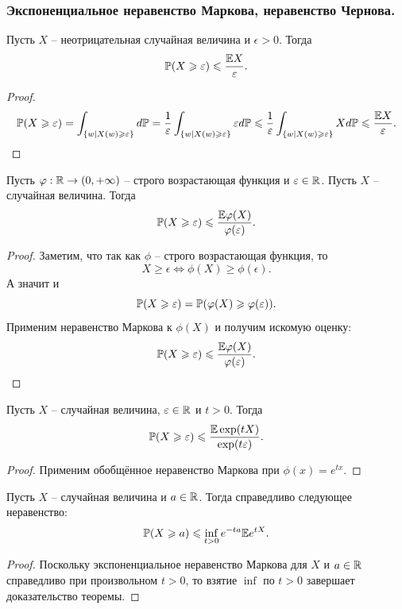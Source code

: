 \subsubsection{Экспоненциальное неравенство Маркова, неравенство Чернова.}
\begin{theorem}
    Пусть $X$ -- неотрицательная случайная величина и $\epsilon > 0$. Тогда
    \[
        \P(X \geq \epsilon) \leq \dfrac{\Ex X}{\epsilon}.
    \]
\end{theorem}
\begin{proof}
    \[
        \P(X \geq \epsilon) = \int_{\{w \mid X(w) \geq \epsilon\}} d\P = \dfrac{1}{\epsilon} \int_{\{w \mid X(w) \geq \epsilon\}} \epsilon d\P \leq \dfrac{1}{\epsilon} \int_{\{w \mid X(w) \geq \epsilon\}} Xd\P \leq \dfrac{\Ex X}{\epsilon}.
    \]
\end{proof}
\begin{theorem}
    Пусть $\phi: \R \to (0, +\infty)$ -- строго возрастающая функция и $\epsilon \in \R$. Пусть $X$ -- случайная величина. Тогда
    \[
        \P(X \geq \epsilon) \leq \dfrac{\Ex \phi(X)}{\phi(\epsilon)}.
    \]
\end{theorem}
\begin{proof}
    Заметим, что так как $\phi$ -- строго возрастающая функция, то 
    \[
        X \geq \epsilon \Longleftrightarrow \phi(X) \geq \phi(\epsilon).
    \]
    А значит и 
    \[
        \P(X \geq \epsilon) = \P(\phi(X) \geq \phi(\epsilon)).
    \]
    Применим неравенство Маркова к $\phi(X)$ и получим искомую оценку:
    \[
        \P(X \geq \epsilon) \leq \dfrac{\Ex \phi(X)}{\phi(\epsilon)}.
    \]
\end{proof}
\begin{corollary}
    Пусть $X$ -- случайная величина, $\epsilon \in \R$ и $t > 0$. Тогда
    \[
        \P(X \geq \epsilon) \leq \dfrac{\Ex \exp(tX)}{\exp(t\epsilon)}.
    \]
\end{corollary}
\begin{proof}
    Применим обобщённое неравенство Маркова при $\phi(x) = e^{tx}$.
\end{proof}
\begin{corollary}
    Пусть $X$ -- случайная величина и $a \in \R$. Тогда справедливо следующее неравенство:
    \[
        \P(X \geq a) \leq \inf\limits_{t > 0} e^{-ta}\Ex e^{tX}.
    \]
\end{corollary}
\begin{proof}
    Поскольку экспоненциальное неравенство Маркова для $X$ и $a \in \R$ справедливо при произвольном $t > 0$, то взятие $\inf$ по $t > 0$ завершает доказательство теоремы.
\end{proof}
